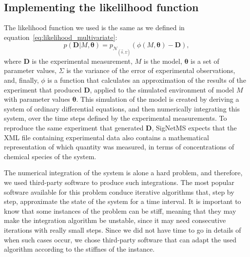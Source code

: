 \subsection{Implementing the likelilhood function}
The likelihood function we used is the same as we defined in
equation~\ref{eq:likelihood_multivariate}:
\begin{equation*}
    p ({\bm D} | M,{\bm \theta}) = 
        p_{\mathcal{N}_{\left(\vec{0}, \Sigma\right)}}
        (\phi (M, {\bm\theta}) - {\bm D}),
\end{equation*}
where ${\bm D}$ is the experimental measurement, $M$ is the model,
${\bm \theta}$ is a set of parameter values, $\Sigma$ is the variance of
the error of experimental observations, and, finally, $\phi$ is a 
function that calculates an approximation of the results of the
experiment that produced ${\bm D}$, applied to the simulated environment
of model $M$ with parameter values ${\bm \theta}$. This simulation of
the model is created by deriving a system of ordinary differential
equations, and then numerically integrating this system, over the time
steps defined by the experimental measurements. To reproduce the same
experiment that generated ${\bm D}$, SigNetMS expects that the XML file 
containing experimental data also contains a mathematical representation
of which quantity was measured, in terms of concentrations of chemical
species of the system.

The numerical integration of the system is alone a hard problem, and
therefore, we used third-party software to produce such integrations.
The most popular software available for this problem conduce
iterative algorithms that, step by step, approximate the state of the
system for a time interval. It is important to know that some instances
of the problem can be stiff, meaning that they may make the integration
algorithm be unstable, since it may need consecutive iterations with
really small steps. Since we did not have time to go in details of when 
such cases occur, we chose third-party software that can adapt the used
algorithm according to the stiffnes of the instance.

